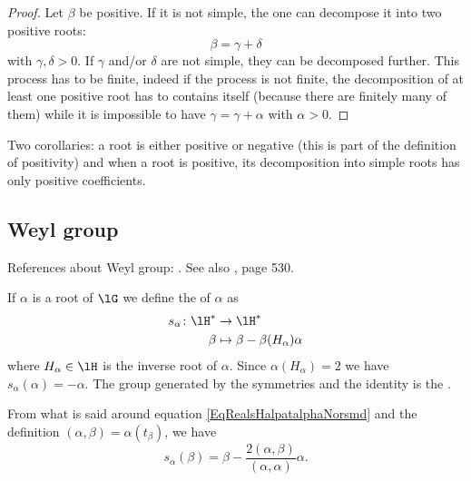 \begin{proof}
	Let \( \beta\) be positive. If it is not simple, the one can decompose it into two positive roots:
	\begin{equation}
		\beta=\gamma+\delta
	\end{equation}
	with \( \gamma,\delta>0\). If \( \gamma\) and/or \( \delta\) are not simple, they can be decomposed further. This process has to be finite, indeed if the process is not finite, the decomposition of at least one positive root has to contains itself (because there are finitely many of them) while it is impossible to have \( \gamma=\gamma+\alpha\) with \( \alpha>0\).
\end{proof}

Two corollaries: a root is either positive or negative (this is part of the definition of positivity) and when a root is positive, its decomposition into simple roots has only positive coefficients.


\subsection{Weyl group}
References about Weyl group: \cite{Knapp_reprez}. See also \cite{Cornwell}, page 530.

If \( \alpha\) is a root of \( \lG\) we define the  of \( \alpha\) as
\begin{equation}
	\begin{aligned}
		s_{\alpha}\colon \lH^* & \to \lH^*                             \\
		\beta                  & \mapsto \beta-\beta(H_{\alpha})\alpha
	\end{aligned}
\end{equation}
where \( H_{\alpha}\in\lH\) is the inverse root of \( \alpha\). Since \( \alpha(H_{\alpha})=2\) we have \( s_{\alpha}(\alpha)=-\alpha\). The group generated by the symmetries and the identity is the .

From what is said around equation \eqref{EqRealsHalpatalphaNorsmd} and the definition \( (\alpha,\beta)=\alpha(t_{\beta})\), we have
\begin{equation}
	s_{\alpha}(\beta)=\beta-\frac{ 2(\alpha,\beta) }{ (\alpha,\alpha) }\alpha.
\end{equation}

